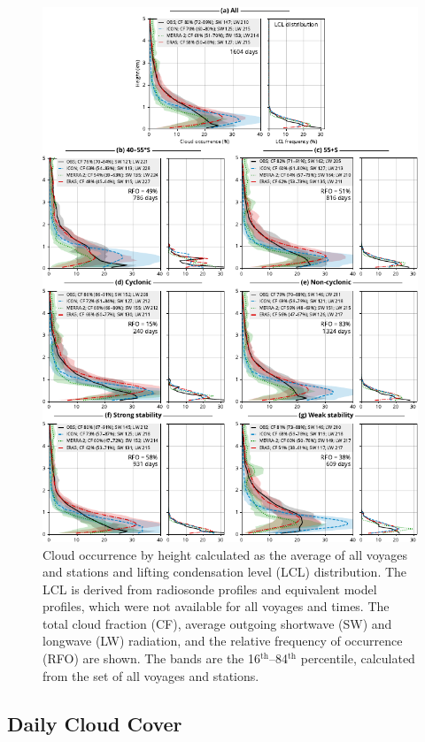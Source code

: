 \documentclass[draft]{agujournal2019}
\begin{document}
\begin{figure}[p!]
\centering
\includegraphics[width=\textwidth]{img/cl_agg_rev1.pdf}
\caption{
Cloud occurrence by height calculated as the average of all voyages and stations and lifting condensation level (LCL) distribution. The LCL is derived from radiosonde profiles and equivalent model profiles, which were not available for all voyages and times. The total cloud fraction (CF), average outgoing shortwave (SW) and longwave (LW) radiation, and the relative frequency of occurrence (RFO) are shown. The bands are the 16$^\mathrm{th}$--84$^\mathrm{th}$ percentile, calculated from the set of all voyages and stations.
}
\label{fig:cloud-occurrence}
\end{figure}

\subsection{Daily Cloud Cover}
\label{sec:cloud-cover}
\end{document}
